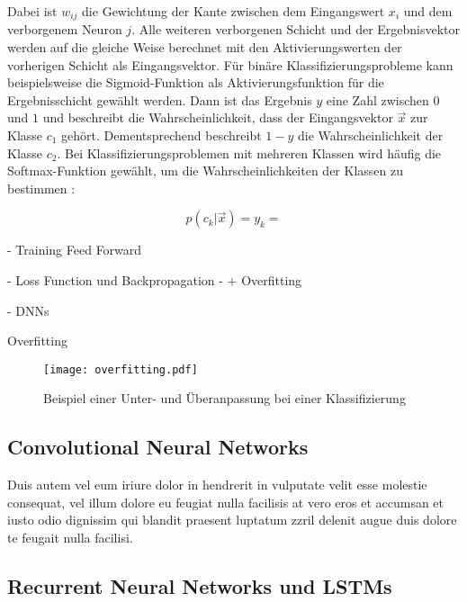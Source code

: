 Dabei ist $w_{ij}$ die Gewichtung der Kante zwischen dem Eingangswert $x_i$ und dem verborgenem Neuron $j$. Alle weiteren verborgenen Schicht und der Ergebnisvektor werden auf die gleiche Weise berechnet mit den Aktivierungswerten der vorherigen Schicht als Eingangsvektor. Für binäre Klassifizierungsprobleme kann beispielsweise die Sigmoid-Funktion als Aktivierungsfunktion für die Ergebnisschicht gewählt werden. Dann ist das Ergebnis $y$ eine Zahl zwischen $0$ und $1$ und beschreibt die Wahrscheinlichkeit, dass der Eingangsvektor $\vec{x}$ zur Klasse $c_1$ gehört. Dementsprechend beschreibt $1-y$ die Wahrscheinlichkeit der Klasse $c_2$. Bei Klassifizierungsproblemen mit mehreren Klassen wird häufig die Softmax-Funktion gewählt, um die Wahrscheinlichkeiten der Klassen zu bestimmen \cite{bridle1990probabilistic}:

\begin{equation}
p(c_k|\vec{x}) = y_k = 
\end{equation}




- Training Feed Forward

- Loss Function und Backpropagation
- + Overfitting

- DNNs


Overfitting

\begin{figure}[h]
\centering
\texttt{[image: overfitting.pdf]}
\caption{Beispiel einer Unter- und Überanpassung bei einer Klassifizierung}
\label{fig_overfitting}
\end{figure}


\subsection{Convolutional Neural Networks}
\label{grundlagen_nn_cnn}

Duis autem vel eum iriure dolor in hendrerit in vulputate velit esse molestie consequat, vel illum dolore eu feugiat nulla facilisis at vero eros et accumsan et iusto odio dignissim qui blandit praesent luptatum zzril delenit augue duis dolore te feugait nulla facilisi. 


\subsection{Recurrent Neural Networks und LSTMs}
\label{grundlagen_nn_rnn}

